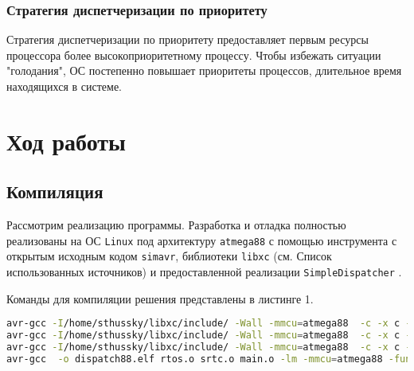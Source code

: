 
\subsubsection{Стратегия диспетчеризации по приоритету}
Стратегия диспетчеризации по приоритету предоставляет первым ресурсы процессора более высокоприоритетному процессу. Чтобы избежать ситуации "голодания", ОС постепенно повышает приоритеты процессов, длительное время находящихся в системе.
\clearpage



\section{Ход работы}

\subsection{Компиляция}
Рассмотрим реализацию программы. Разработка и отладка полностью реализованы на ОС \texttt{Linux} под архитектуру \texttt{atmega88} с помощью инструмента с открытым исходным кодом \texttt{simavr}, библиотеки \texttt{libxc} (см. Список использованных источников) и предоставленной реализации \texttt{SimpleDispatcher} \cite{libxc} \cite{simavr}.

Команды для компиляции решения представлены в листинге 1.

\begin{lstlisting}[language=bash, caption={Команды для компиляции}, numbers=none, lineskip={0pt}]
avr-gcc -I/home/sthussky/libxc/include/ -Wall -mmcu=atmega88  -c -x c -funsigned-char -funsigned-bitfields -Og -ffunction-sections -fdata-sections -fpack-struct -fshort-enums -g2 -Wall -MD -MP -MF -c main.c -o main.o
avr-gcc -I/home/sthussky/libxc/include/ -Wall -mmcu=atmega88  -c -x c -funsigned-char -funsigned-bitfields -Og -ffunction-sections -fdata-sections -fpack-struct -fshort-enums -g2 -Wall -MD -MP -MF -c rtos.c -o rtos.o
avr-gcc -I/home/sthussky/libxc/include/ -Wall -mmcu=atmega88  -c -x c -funsigned-char -funsigned-bitfields -Og -ffunction-sections -fdata-sections -fpack-struct -fshort-enums -g2 -Wall -MD -MP -MF -c software_RTC.c -o srtc.o -fcommon
avr-gcc  -o dispatch88.elf rtos.o srtc.o main.o -lm -mmcu=atmega88 -funsigned-char -funsigned-bitfields -Wl,--start-group -Wl,-lm  -Wl,--end-group -Wl,--gc-sections -Og -ffunction-sections -fdata-sections -fpack-struct -fshort-enums  -Wl,-Map="simpleDispatcher.map" -fcommon
\end{lstlisting}

